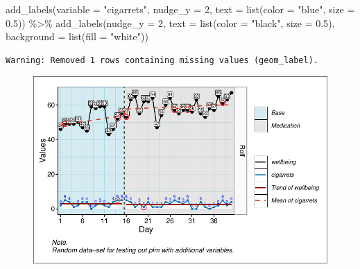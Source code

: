 \documentclass[
  letterpaper,
  DIV=11,
  numbers=noendperiod]{scrreprt}
\newenvironment{Shaded}{\begin{snugshade}}{\end{snugshade}}
\newcommand{\AttributeTok}[1]{\textcolor[rgb]{0.40,0.45,0.13}{#1}}
\newcommand{\DecValTok}[1]{\textcolor[rgb]{0.68,0.00,0.00}{#1}}
\newcommand{\FloatTok}[1]{\textcolor[rgb]{0.68,0.00,0.00}{#1}}
\newcommand{\FunctionTok}[1]{\textcolor[rgb]{0.28,0.35,0.67}{#1}}
\newcommand{\NormalTok}[1]{\textcolor[rgb]{0.00,0.23,0.31}{#1}}
\newcommand{\SpecialCharTok}[1]{\textcolor[rgb]{0.37,0.37,0.37}{#1}}
\newcommand{\StringTok}[1]{\textcolor[rgb]{0.13,0.47,0.30}{#1}}
\begin{document}
\begin{Shaded}
\begin{Highlighting}[]
  \FunctionTok{add\_labels}\NormalTok{(}\AttributeTok{variable =} \StringTok{"cigarrets"}\NormalTok{, }\AttributeTok{nudge\_y =} \DecValTok{2}\NormalTok{, }
             \AttributeTok{text =} \FunctionTok{list}\NormalTok{(}\AttributeTok{color =} \StringTok{"blue"}\NormalTok{, }\AttributeTok{size =} \FloatTok{0.5}\NormalTok{)) }\SpecialCharTok{\%\textgreater{}\%}
  \FunctionTok{add\_labels}\NormalTok{(}\AttributeTok{nudge\_y =} \DecValTok{2}\NormalTok{, }\AttributeTok{text =} \FunctionTok{list}\NormalTok{(}\AttributeTok{color =} \StringTok{"black"}\NormalTok{, }\AttributeTok{size =} \FloatTok{0.5}\NormalTok{),}
             \AttributeTok{background =} \FunctionTok{list}\NormalTok{(}\AttributeTok{fill =} \StringTok{"white"}\NormalTok{))}
\end{Highlighting}
\end{Shaded}

\begin{verbatim}
Warning: Removed 1 rows containing missing values (geom_label).
\end{verbatim}

\begin{figure}[H]

{\centering \includegraphics{./ch_scplot_files/figure-pdf/complex2-1.pdf}

}

\end{figure}
\end{document}
